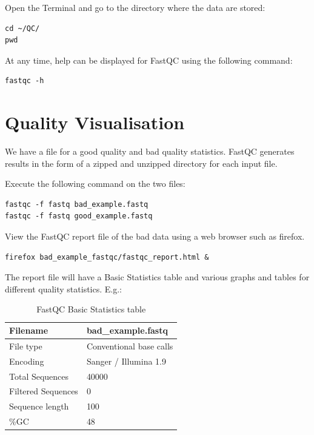 \begin{steps}
Open the Terminal and go to the directory where the data are stored:
\begin{lstlisting}
cd ~/QC/
pwd
\end{lstlisting}

At any time, help can be displayed for FastQC using the following command:
\begin{lstlisting}
fastqc -h
\end{lstlisting}

\end{steps}


\section{Quality Visualisation}

\begin{information}
We have a file for a good quality and bad quality statistics. FastQC generates
results in the form of a zipped and unzipped directory for each input file.
\end{information}

\begin{steps}
Execute the following command on the two files:
\begin{lstlisting}
fastqc -f fastq bad_example.fastq 
fastqc -f fastq good_example.fastq
\end{lstlisting}

View the FastQC report file of the bad data using a web browser such as
firefox.

\begin{lstlisting}
firefox bad_example_fastqc/fastqc_report.html &
\end{lstlisting}

\end{steps}

\begin{note}
The report file will have a Basic Statistics table and various graphs and tables
for different quality statistics. E.g.:
\end{note}

\begin{table}[H]
  \centering
  \caption{FastQC Basic Statistics table}
    \begin{tabular}{ll}
    \toprule
    Filename & bad\_example.fastq \\
    \midrule
    File type & Conventional base calls \\
    Encoding & Sanger / Illumina 1.9 \\
    Total Sequences & 40000 \\
    Filtered Sequences & 0 \\
    Sequence length & 100 \\
    \%GC  & 48 \\
    \bottomrule
    \end{tabular}
  \label{tab:badexampleuntrimmed}
\end{table}

